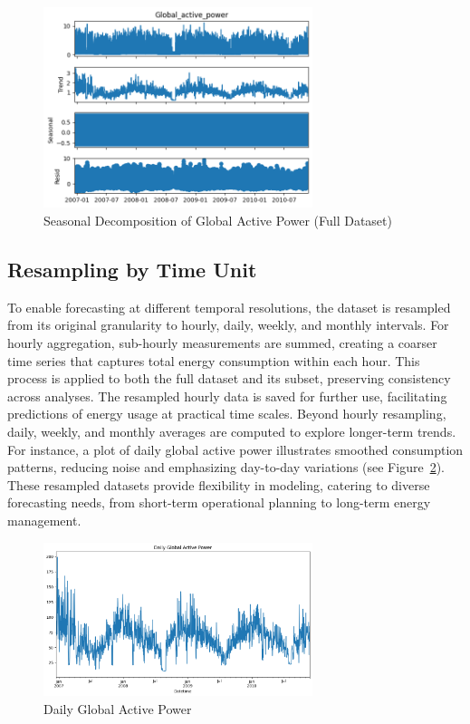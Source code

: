 	\begin{figure}[htbp]
		\centering
		\includegraphics[width=0.7\textwidth]{./figures_aman/seasonal_decomposition_full.png}
		\caption{Seasonal Decomposition of Global Active Power (Full Dataset)}
		\label{fig:decomposition_full}
	\end{figure}
	
	\subsection{Resampling by Time Unit}
	To enable forecasting at different temporal resolutions, the dataset is resampled from its original granularity to hourly, daily, weekly, and monthly intervals. For hourly aggregation, sub-hourly measurements are summed, creating a coarser time series that captures total energy consumption within each hour. This process is applied to both the full dataset and its subset, preserving consistency across analyses. The resampled hourly data is saved for further use, facilitating predictions of energy usage at practical time scales. Beyond hourly resampling, daily, weekly, and monthly averages are computed to explore longer-term trends. For instance, a plot of daily global active power illustrates smoothed consumption patterns, reducing noise and emphasizing day-to-day variations (see Figure~\ref{fig:daily_power}). These resampled datasets provide flexibility in modeling, catering to diverse forecasting needs, from short-term operational planning to long-term energy management.
	
	\begin{figure}[htbp]
		\centering
		\includegraphics[width=0.7\textwidth]{./figures_aman/daily_global_active_power.png}
		\caption{Daily Global Active Power}
		\label{fig:daily_power}
	\end{figure}
	
